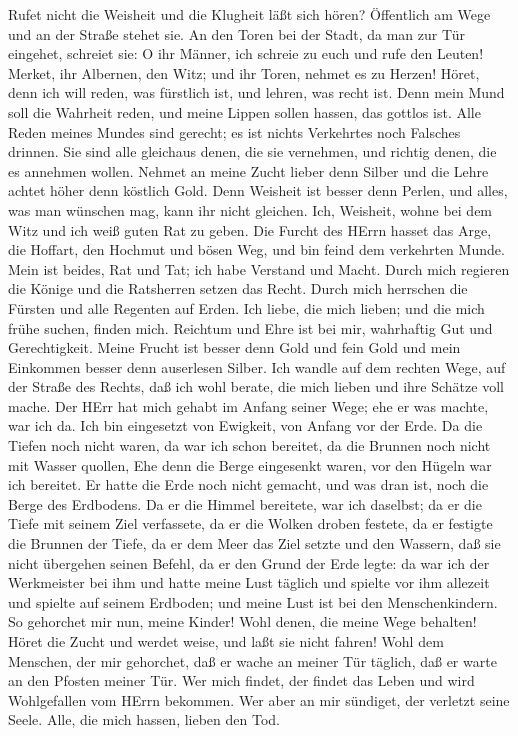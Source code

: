 Rufet nicht die Weisheit und die Klugheit läßt sich hören?
 Öffentlich am Wege und an der Straße stehet sie.
 An den Toren bei der Stadt, da man zur Tür eingehet,
schreiet sie:  O ihr Männer, ich schreie zu euch und rufe
den Leuten!  Merket, ihr Albernen, den Witz; und ihr Toren,
nehmet es zu Herzen!  Höret, denn ich will reden, was
fürstlich ist, und lehren, was recht ist.  Denn mein Mund
soll die Wahrheit reden, und meine Lippen sollen hassen, das gottlos
ist.  Alle Reden meines Mundes sind gerecht; es ist nichts
Verkehrtes noch Falsches drinnen.  Sie sind alle gleichaus
denen, die sie vernehmen, und richtig denen, die es annehmen wollen.
 Nehmet an meine Zucht lieber denn Silber und die Lehre
achtet höher denn köstlich Gold.  Denn Weisheit ist besser
denn Perlen, und alles, was man wünschen mag, kann ihr nicht gleichen.
 Ich, Weisheit, wohne bei dem Witz und ich weiß guten Rat
zu geben.  Die Furcht des HErrn hasset das Arge, die
Hoffart, den Hochmut und bösen Weg, und bin feind dem verkehrten Munde.
 Mein ist beides, Rat und Tat; ich habe Verstand und Macht.
 Durch mich regieren die Könige und die Ratsherren setzen
das Recht.  Durch mich herrschen die Fürsten und alle
Regenten auf Erden.  Ich liebe, die mich lieben; und die
mich frühe suchen, finden mich.  Reichtum und Ehre ist bei
mir, wahrhaftig Gut und Gerechtigkeit.  Meine Frucht ist
besser denn Gold und fein Gold und mein Einkommen besser denn auserlesen
Silber.  Ich wandle auf dem rechten Wege, auf der Straße
des Rechts,  daß ich wohl berate, die mich lieben und ihre
Schätze voll mache.  Der HErr hat mich gehabt im Anfang
seiner Wege; ehe er was machte, war ich da.  Ich bin
eingesetzt von Ewigkeit, von Anfang vor der Erde.  Da die
Tiefen noch nicht waren, da war ich schon bereitet, da die Brunnen noch
nicht mit Wasser quollen,  Ehe denn die Berge eingesenkt
waren, vor den Hügeln war ich bereitet.  Er hatte die Erde
noch nicht gemacht, und was dran ist, noch die Berge des Erdbodens.
 Da er die Himmel bereitete, war ich daselbst; da er die
Tiefe mit seinem Ziel verfassete,  da er die Wolken droben
festete, da er festigte die Brunnen der Tiefe,  da er dem
Meer das Ziel setzte und den Wassern, daß sie nicht übergehen seinen
Befehl, da er den Grund der Erde legte:  da war ich der
Werkmeister bei ihm und hatte meine Lust täglich und spielte vor ihm
allezeit  und spielte auf seinem Erdboden; und meine Lust
ist bei den Menschenkindern.  So gehorchet mir nun, meine
Kinder! Wohl denen, die meine Wege behalten!  Höret die
Zucht und werdet weise, und laßt sie nicht fahren!  Wohl
dem Menschen, der mir gehorchet, daß er wache an meiner Tür täglich, daß
er warte an den Pfosten meiner Tür.  Wer mich findet, der
findet das Leben und wird Wohlgefallen vom HErrn bekommen. 
Wer aber an mir sündiget, der verletzt seine Seele. Alle, die mich
hassen, lieben den Tod.


